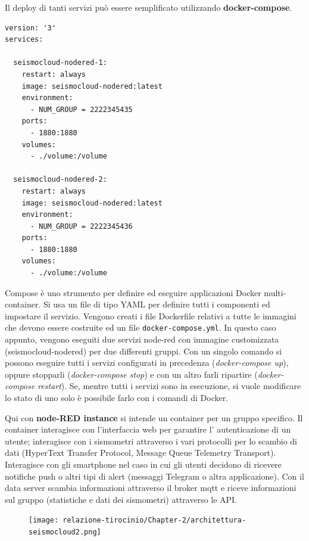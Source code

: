 \documentclass[a4paper,10pt]{memoir}
\begin{document}
\vspace{0.02\textwidth}
Il deploy di tanti servizi può essere semplificato utilizzando \textbf{docker-compose}.
\begin{lstlisting}[language=docker-compose-2]
version: '3'
services:

  seismocloud-nodered-1:
    restart: always
    image: seismocloud-nodered:latest
    environment:
      - NUM_GROUP = 2222345435
    ports:
      - 1880:1880
    volumes:
      - ./volume:/volume
      
  seismocloud-nodered-2:
    restart: always
    image: seismocloud-nodered:latest
    environment:
      - NUM_GROUP = 2222345436
    ports:
      - 1880:1880
    volumes:
      - ./volume:/volume
\end{lstlisting}
Compose è uno strumento per definire ed eseguire applicazioni Docker multi-container. Si usa un file di tipo YAML per definire tutti i componenti ed impostare il servizio.
Vengono creati i file Dockerfile relativi a tutte le immagini che devono essere costruite ed un file \texttt{docker-compose.yml}.
In questo caso appunto, vengono eseguiti due servizi node-red con immagine customizzata (seismocloud-nodered) per due differenti gruppi.
Con un singolo comando si possono eseguire tutti i servizi configurati in precedenza (\textit{docker-compose up}), oppure stopparli (\textit{docker-compose stop}) e con un altro farli ripartire (\textit{docker-compose restart}).
Se, mentre tutti i servizi sono in esecuzione, si vuole modificare lo stato di uno solo è possibile farlo con i comandi di Docker.
\clearpage

Qui con \textbf{node-RED instance} si intende un container per un gruppo specifico.
Il container interagisce con l'interfaccia web per garantire l' autenticazione di un utente; interagisce con i sismometri attraverso i vari protocolli per lo scambio di dati (HyperText Transfer Protocol, Message Queue Telemetry Transport).
Interagisce con gli smartphone nel caso in cui gli utenti decidono di ricevere notifiche push o altri tipi di alert (messaggi Telegram o altra applicazione).
Con il data server scambia informazioni attraverso il broker mqtt e riceve informazioni sul gruppo (statistiche e dati dei sismometri) attraverso le API.
\begin{figure}[ht]
\texttt{[image: relazione-tirocinio/Chapter-2/architettura-seismocloud2.png]}
\end{figure}

\end{document}
